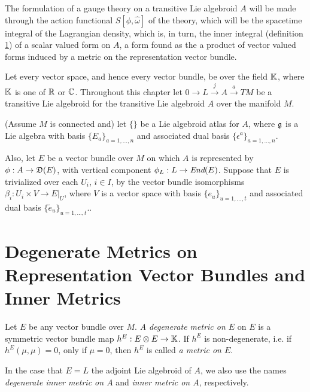 The formulation of a gauge theory on a transitive Lie algebroid $A$ will be made through the action functional $S[\phi, \hat \omega]$ of the theory, which will be the spacetime integral of the Lagrangian density, which is, in turn, the inner integral (definition \ref{}) of a scalar valued form on $A$, a form found as the a product of vector valued forms induced by a metric on the representation vector bundle.

Let every vector space, and hence every vector bundle, be over the field $\mathbb{K}$, where $\mathbb{K}$ is one of $\mathbb{R}$ or $\mathbb{C}$. Throughout this chapter let $0 \to L \xrightarrow{j} A \xrightarrow{a} TM$ be a transitive Lie algebroid for the transitive Lie algebroid $A$ over the manifold $M$.

(Assume $M$ is connected and) let $\{\}$ be a Lie algebroid atlas for $A$, where $\mathfrak{g}$ is a Lie algebra with basis $\{E_a\}_{a = 1, \dots, n}$ and associated dual basis $\{\epsilon^a\}_{a = 1, \dots, n}$.

Also, let $E$ be a vector bundle over $M$ on which $A$ is represented by $\phi: A \to \alg D(E)$, with vertical component $\phi_L: L \to \End(E)$. Suppose that $E$ is trivialized over each $U_i$, $i \in I$, by the vector bundle isomorphisms $\beta_i: U_i \times V \to E|_U$, where $V$ is a vector space with basis $\{e_u\}_{u = 1, \dots, t}$ and associated dual basis $\{\tilde e_u\}_{u = 1, \dots, t}$..

\section{Degenerate Metrics on Representation Vector Bundles and Inner Metrics}

\begin{definition}
    Let $E$ be any vector bundle over $M$. \emph{A degenerate metric on $E$} on $E$ is a symmetric vector bundle map $h^E: E \otimes E \to \mathbb{K}$. If $h^E$ is non-degenerate, i.e. if $h^E(\mu, \mu) = 0$, only if $\mu = 0$, then $h^E$ is called \emph{a metric on $E$}.
    
    In the case that $E = L$ the adjoint Lie algebroid of $A$, we also use the names \emph{degenerate inner metric on $A$} and \emph{inner metric on $A$}, respectively.
\end{definition}


